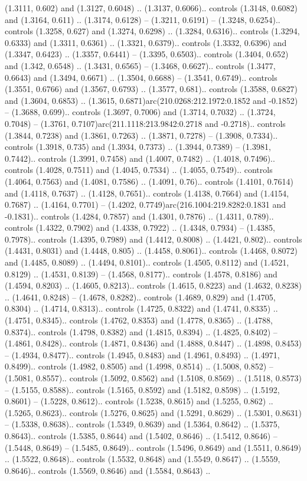(1.3111, 0.602) and (1.3127, 0.6048) .. (1.3137, 0.6066).. controls (1.3148, 0.6082) and (1.3164, 0.611) .. (1.3174, 0.6128) -- (1.3211, 0.6191) -- (1.3248, 0.6254).. controls (1.3258, 0.627) and (1.3274, 0.6298) .. (1.3284, 0.6316).. controls (1.3294, 0.6333) and (1.3311, 0.6361) .. (1.3321, 0.6379).. controls (1.3332, 0.6396) and (1.3347, 0.6423) .. (1.3357, 0.6441) -- (1.3395, 0.6503).. controls (1.3404, 0.652) and (1.342, 0.6548) .. (1.3431, 0.6565) -- (1.3468, 0.6627).. controls (1.3477, 0.6643) and (1.3494, 0.6671) .. (1.3504, 0.6688) -- (1.3541, 0.6749).. controls (1.3551, 0.6766) and (1.3567, 0.6793) .. (1.3577, 0.681).. controls (1.3588, 0.6827) and (1.3604, 0.6853) .. (1.3615, 0.6871)arc(210.0268:212.1972:0.1852 and -0.1852) -- (1.3688, 0.699).. controls (1.3697, 0.7006) and (1.3714, 0.7032) .. (1.3724, 0.7048) -- (1.3761, 0.7107)arc(211.1118:213.9842:0.2718 and -0.2718).. controls (1.3844, 0.7238) and (1.3861, 0.7263) .. (1.3871, 0.7278) -- (1.3908, 0.7334).. controls (1.3918, 0.735) and (1.3934, 0.7373) .. (1.3944, 0.7389) -- (1.3981, 0.7442).. controls (1.3991, 0.7458) and (1.4007, 0.7482) .. (1.4018, 0.7496).. controls (1.4028, 0.7511) and (1.4045, 0.7534) .. (1.4055, 0.7549).. controls (1.4064, 0.7563) and (1.4081, 0.7586) .. (1.4091, 0.76).. controls (1.4101, 0.7614) and (1.4118, 0.7637) .. (1.4128, 0.7651).. controls (1.4138, 0.7664) and (1.4154, 0.7687) .. (1.4164, 0.7701) -- (1.4202, 0.7749)arc(216.1004:219.8282:0.1831 and -0.1831).. controls (1.4284, 0.7857) and (1.4301, 0.7876) .. (1.4311, 0.789).. controls (1.4322, 0.7902) and (1.4338, 0.7922) .. (1.4348, 0.7934) -- (1.4385, 0.7978).. controls (1.4395, 0.7989) and (1.4412, 0.8008) .. (1.4421, 0.802).. controls (1.4431, 0.8031) and (1.4448, 0.805) .. (1.4458, 0.8061).. controls (1.4468, 0.8072) and (1.4485, 0.8089) .. (1.4494, 0.8101).. controls (1.4505, 0.8112) and (1.4521, 0.8129) .. (1.4531, 0.8139) -- (1.4568, 0.8177).. controls (1.4578, 0.8186) and (1.4594, 0.8203) .. (1.4605, 0.8213).. controls (1.4615, 0.8223) and (1.4632, 0.8238) .. (1.4641, 0.8248) -- (1.4678, 0.8282).. controls (1.4689, 0.829) and (1.4705, 0.8304) .. (1.4714, 0.8313).. controls (1.4725, 0.8322) and (1.4741, 0.8335) .. (1.4751, 0.8345).. controls (1.4762, 0.8353) and (1.4778, 0.8365) .. (1.4788, 0.8374).. controls (1.4798, 0.8382) and (1.4815, 0.8394) .. (1.4825, 0.8402) -- (1.4861, 0.8428).. controls (1.4871, 0.8436) and (1.4888, 0.8447) .. (1.4898, 0.8453) -- (1.4934, 0.8477).. controls (1.4945, 0.8483) and (1.4961, 0.8493) .. (1.4971, 0.8499).. controls (1.4982, 0.8505) and (1.4998, 0.8514) .. (1.5008, 0.852) -- (1.5081, 0.8557).. controls (1.5092, 0.8562) and (1.5108, 0.8569) .. (1.5118, 0.8573) -- (1.5155, 0.8588).. controls (1.5165, 0.8592) and (1.5182, 0.8598) .. (1.5192, 0.8601) -- (1.5228, 0.8612).. controls (1.5238, 0.8615) and (1.5255, 0.862) .. (1.5265, 0.8623).. controls (1.5276, 0.8625) and (1.5291, 0.8629) .. (1.5301, 0.8631) -- (1.5338, 0.8638).. controls (1.5349, 0.8639) and (1.5364, 0.8642) .. (1.5375, 0.8643).. controls (1.5385, 0.8644) and (1.5402, 0.8646) .. (1.5412, 0.8646) -- (1.5448, 0.8649) -- (1.5485, 0.8649).. controls (1.5496, 0.8649) and (1.5511, 0.8649) .. (1.5522, 0.8648).. controls (1.5532, 0.8648) and (1.5549, 0.8647) .. (1.5559, 0.8646).. controls (1.5569, 0.8646) and (1.5584, 0.8643) .. 